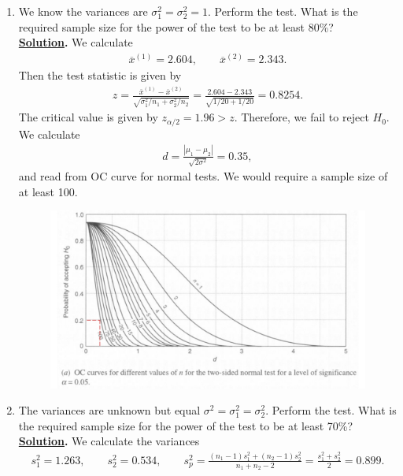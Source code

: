 \begin{enumerate}
	\item We know the variances are $\sigma_1^2 = \sigma_2^2 = 1$. Perform the test. What is the required sample size for the power of the test to be at least 80\%? \\
	\textbf{\underline{Solution}.} We calculate
	\begin{align*}
	\overline{x}^{(1)} = 2.604, \qquad \overline{x}^{(2)} = 2.343.
	\end{align*}
	Then the test statistic is given by
	\begin{align*}
	z = \frac{\overline{x}^{(1)} - \overline{x}^{(2)}}{\sqrt{\sigma_1^2/n_1 + \sigma_2^2/n_2}} = \frac{2.604 - 2.343}{\sqrt{1/20+1/20}} = 0.8254.
	\end{align*}
	The critical value is given by $z_{\alpha/2} = 1.96 > z$. Therefore, we fail to reject $H_0$. We calculate
	\begin{align*}
	d = \frac{|\mu_1-\mu_2|}{\sqrt{2\sigma^2}} = 0.35,
	\end{align*}
	and read from OC curve for normal tests. We would require a sample size of at least 100.
	\begin{figure}[H]
		\centering
		\includegraphics[width=\linewidth]{./images/s6fig1.pdf}
	\end{figure}
	\item The variances are unknown but equal $\sigma^2 = \sigma_1^2 = \sigma_2^2$. Perform the test. What is the required sample size for the power of the test to be at least 70\%? \\
	\textbf{\underline{Solution}.} We calculate the variances
	\begin{align*}
	s_1^2 = 1.263, \qquad s_2^2 = 0.534, \qquad s_p^2 = \frac{(n_1-1)s_1^2 + (n_2-1)s_2^2}{n_1+n_2-2} = \frac{s_1^2 + s_2^2}{2} = 0.899.
	\end{align*}

\end{enumerate}
